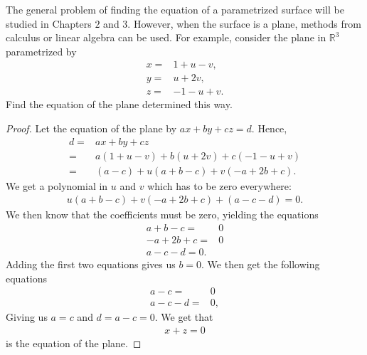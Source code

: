 \begin{exercise}{13}
The general problem of finding the equation of a parametrized surface will be studied in Chapters $2$ and $3$. 
However, when the surface is a plane, methods from calculus or linear algebra can be used. 
For example, consider the plane in $\mathbb{R}^3$ parametrized by
\begin{align*}
    x =& 1 + u - v,\\
    y =& u + 2v,\\
    z =& -1 - u + v.
\end{align*}
Find the equation of the plane determined this way.
\end{exercise}
\begin{proof}
    Let the equation of the plane by $ax+by+cz = d$. Hence,
    \begin{align*}
        d
        =& ax+by+cz\\
        =& a(1+u-v) + b(u + 2v) + c(-1 - u + v)\\
        =& (a-c) + u(a + b - c) + v(-a + 2b + c).
    \end{align*}
    We get a polynomial in $u$ and $v$ which has to be zero everywhere:
    \begin{align*}
        u(a + b - c) + v(-a + 2b + c) + (a-c-d) = 0.
    \end{align*}
    We then know that the coefficients must be zero, yielding the equations
    \begin{align*}
        a + b - c =& 0\\
        -a + 2b + c =& 0\\
        a -c - d = 0.
    \end{align*}
    Adding the first two equations gives us $b=0$. 
    We then get the following equations
    \begin{align*}
        a - c =& 0\\
        a - c - d =& 0,
    \end{align*}
    Giving us $a=c$ and $d = a - c = 0$. 
    We get that
    \begin{align*}
        x + z = 0
    \end{align*}
    is the equation of the plane.
\end{proof}

